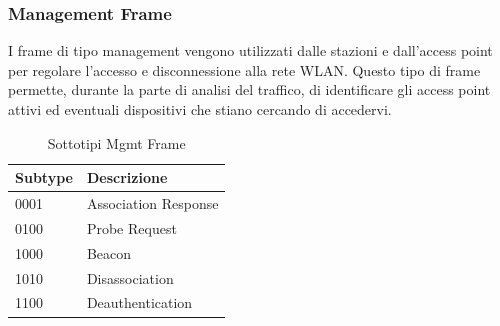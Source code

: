 \newpage

\subsubsection{Management Frame}

I frame di tipo management vengono utilizzati dalle stazioni e dall'access point per regolare l'accesso e disconnessione alla rete WLAN.
Questo tipo di frame permette, durante la parte di analisi del traffico, di identificare gli access point  attivi ed eventuali dispositivi che stiano cercando di accedervi.

\begin{table}
\centering
\begin{tabular}{| l | l |}
	\hline
	Subtype  & Descrizione \\ \hline
	0001	 & Association Response 	\\ \hline
	0100	 & Probe Request \\ \hline
	1000 &	Beacon \\ \hline
	1010	& Disassociation \\ \hline
	1100	& Deauthentication \\ \hline
\end{tabular}
\centering
\caption{Sottotipi Mgmt Frame}
\label{table:managementframes}
\end{table}

